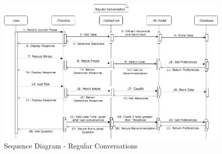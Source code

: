 \begin{figure}[H]
    \centering
    \includegraphics[width=\linewidth]{images/sequence-diagram-regular-conversations.png}
    \caption{Sequence Diagram - Regular Conversations}
\end{figure}